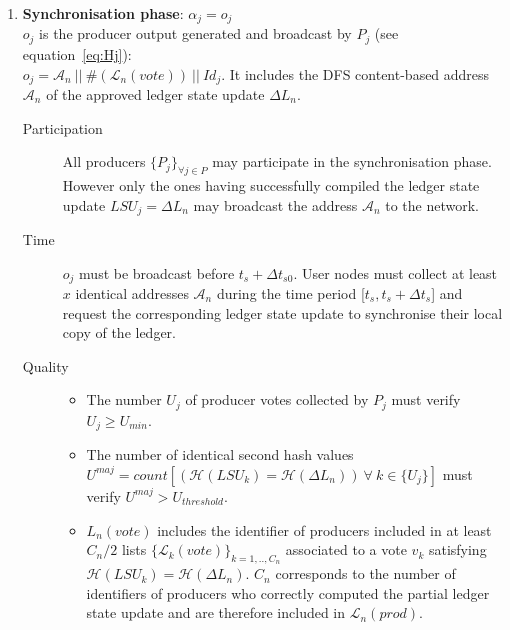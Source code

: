 \begin{enumerate}
\item \textbf{Synchronisation phase}: $\alpha_j = o_j$\\
$o_j$ is the producer output generated and broadcast by $P_j$ (see equation~\ref{eq:Hj}):\\
$o_j = \mathcal{A}_n~||~\#(\mathcal{L}_{n}(vote))~||~Id_j$. It includes the DFS content-based address $\mathcal{A}_n$ of the approved ledger state update $\Delta L_n$. 
\begin{description}
\item[Participation] All producers $\{P_j\}_{\forall j \in P}$ may participate in the synchronisation phase. However only the ones having successfully compiled the ledger state update $LSU_j = \Delta L_n$ may broadcast the address $\mathcal{A}_n$ to the network. 
\item[Time] $o_j$ must be broadcast before $t_s + \Delta t_{s0}$. User nodes must collect at least $x$ identical addresses $ \mathcal{A}_n$ during the time period [$t_s, t_s + \Delta t_{s}$] and request the corresponding ledger state update to synchronise their local copy of the ledger.
\item[Quality] 
\begin{itemize}
\item The number $U_j$ of producer votes collected by $P_j$ must verify $U_j \geq U_{min}$.
\item The number of identical second hash values $U^{maj} = count[(\mathcal{H}(LSU_k) = \mathcal{H}(\Delta L_n))~\forall~k\in\{U_j\}]$ must verify $U^{maj} > U_{threshold}$.
\item $L_n(vote)$ includes the identifier of producers included in at least $C_n/2$ lists $\{\mathcal{L}_{k}(vote)\}_{k=1,..,C_n}$ associated to a vote $v_{k}$ satisfying $\mathcal{H}(LSU_k) = \mathcal{H}(\Delta L_n)$. $C_n$ corresponds to the number of identifiers of producers who correctly computed the partial ledger state update and are therefore included in $\mathcal{L}_{n}(prod)$.
\end{itemize}
\end{description}
\end{enumerate}

